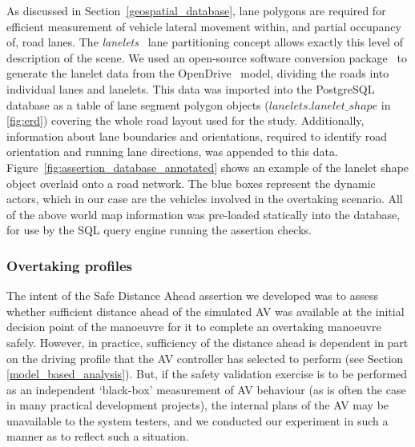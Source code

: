 As discussed in Section~\ref{geospatial_database}, lane polygons are required for efficient measurement of vehicle lateral movement within, and partial occupancy of, road lanes. The \textit{lanelets}~\cite{lanelets2014} lane partitioning concept allows exactly this level of description of the scene. 
%
We used an open-source software conversion package~\cite{lanelets_to_openDrive} to generate the lanelet data from the OpenDrive~\cite{opendrive} model, dividing the roads into individual lanes and lanelets. This data was imported into the PostgreSQL database as a table of lane segment polygon objects ($lanelets.lanelet\_shape$ in \ref{fig:erd}) covering the whole road layout used for the study. Additionally, information about lane boundaries and orientations, required to identify road orientation and running lane directions, was appended to this data. 
%
Figure~\ref{fig:assertion_database_annotated} shows an example of the lanelet shape object overlaid onto a road network. The blue boxes represent the dynamic actors, which in our case are the vehicles involved in the overtaking scenario. 
%
All of the above world map information was pre-loaded statically into the database, for use by the SQL query engine running the assertion checks.

\subsubsection{Overtaking profiles} \label{overtaking_profiles}

The intent of the Safe Distance Ahead assertion we developed was to assess whether sufficient distance ahead of the simulated AV was available at the initial decision point of the manoeuvre for it to complete an overtaking manoeuvre safely. However, in practice, sufficiency of the distance ahead is dependent in part on the driving profile that the AV controller has selected to perform (see Section \ref{model_based_analysis}). But, if the safety validation exercise is to be performed as an independent `black-box' measurement of AV behaviour (as is often the case in many practical development projects), the internal plans of the AV may be unavailable to the system testers, and we conducted our experiment in such a manner as to reflect such a situation.


